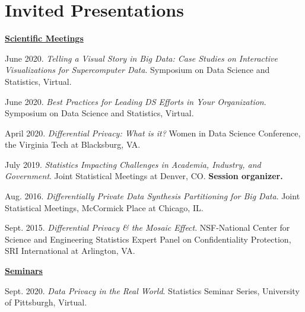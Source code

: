 \documentclass[11pt, letterpaper, roman]{moderncv} %
\begin{document}
\section{Invited Presentations}

\underline{\textbf{\large Scientific Meetings}}\normalsize
\vspace{6pt}
\begin{etaremune}[topsep=0pt, itemsep=6pt, partopsep=0pt, parsep=0pt]
    \item June 2020. \textit{Telling a Visual Story in Big Data: Case Studies on Interactive Visualizations for Supercomputer Data}. Symposium on Data Science and Statistics, Virtual.
  
    \item June 2020. \textit{Best Practices for Leading DS Efforts in Your Organization}. Symposium on Data Science and Statistics, Virtual.  
  
  
    \item April 2020. \textit{Differential Privacy: What is it?} Women in Data Science Conference, the Virginia Tech at Blacksburg, VA.

    \item July 2019. \textit{Statistics Impacting Challenges in Academia, Industry, and Government}. Joint Statistical Meetings at Denver, CO. \textbf{Session organizer.}

    \item Aug. 2016. \textit{Differentially Private Data Synthesis Partitioning for Big Data}. Joint Statistical Meetings, McCormick Place at Chicago, IL.
    
    \item Sept. 2015. \textit{Differential Privacy \& the Mosaic Effect}. NSF-National Center for Science and Engineering Statistics Expert Panel on Confidentiality Protection, SRI International at Arlington, VA.

\vspace{5pt}
\hspace{-0.30in}\underline{\textbf{\large Seminars}}\normalsize
    \item Sept. 2020. \textit{Data Privacy in the Real World}. Statistics Seminar Series, University of Pittsburgh, Virtual.


\end{etaremune}
\end{document}

